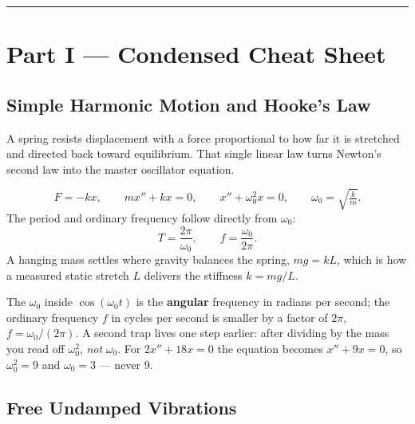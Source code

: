 \vspace{0.6em}
\hrule
\vspace{0.6em}

{}
\section*{Part I --- Condensed Cheat Sheet}
\setcounter{section}{11}   %

\subsection{Simple Harmonic Motion and Hooke's Law}

A spring resists displacement with a force proportional to how far it is stretched
and directed back toward equilibrium. That single linear law turns Newton's second
law into the master oscillator equation.

\begin{formulabox}
\[ F = -kx, \qquad m x'' + k x = 0, \qquad x'' + \omega_0^2 x = 0, \qquad \omega_0 = \sqrt{\tfrac{k}{m}}. \]
The period and ordinary frequency follow directly from $\omega_0$:
\[ T = \frac{2\pi}{\omega_0}, \qquad f = \frac{\omega_0}{2\pi}. \]
A hanging mass settles where gravity balances the spring, $mg = kL$, which is how a
measured static stretch $L$ delivers the stiffness $k = mg/L$.
\end{formulabox}

\begin{warningbox}
The $\omega_0$ inside $\cos(\omega_0 t)$ is the \textbf{angular} frequency in
radians per second; the ordinary frequency $f$ in cycles per second is smaller by a
factor of $2\pi$, $f=\omega_0/(2\pi)$. A second trap lives one step earlier: after
dividing by the mass you read off $\omega_0^{2}$, \emph{not} $\omega_0$. For
$2x''+18x=0$ the equation becomes $x''+9x=0$, so $\omega_0^{2}=9$ and
$\omega_0=3$ --- never $9$.
\end{warningbox}

\subsection{Free Undamped Vibrations}


